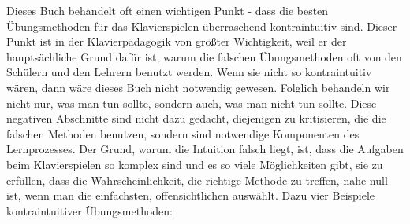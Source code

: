 Dieses Buch behandelt oft einen wichtigen Punkt - dass die besten Übungsmethoden für das Klavierspielen überraschend kontraintuitiv sind.
 Dieser Punkt ist in der Klavierpädagogik von größter Wichtigkeit, weil er der hauptsächliche Grund dafür ist, warum die falschen Übungsmethoden oft von den Schülern und den Lehrern benutzt werden.
 Wenn sie nicht so kontraintuitiv wären, dann wäre dieses Buch nicht notwendig gewesen.
 Folglich behandeln wir nicht nur, was man tun sollte, sondern auch, was man nicht tun sollte.
 Diese negativen Abschnitte sind nicht dazu gedacht, diejenigen zu kritisieren, die die falschen Methoden benutzen, sondern sind notwendige Komponenten des Lernprozesses.
 Der Grund, warum die Intuition falsch liegt, ist, dass die Aufgaben beim Klavierspielen so komplex sind und es so viele Möglichkeiten gibt, sie zu erfüllen, dass die Wahrscheinlichkeit, die richtige Methode zu treffen, nahe null ist, wenn man die einfachsten, offensichtlichen auswählt.
 Dazu vier Beispiele kontraintuitiver Übungsmethoden:
 

